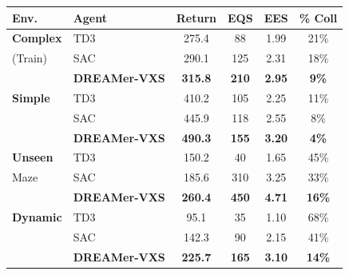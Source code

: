 \begin{table}
\centering


\begin{tabular}{@{}llcccc@{}}
\toprule
\textbf{Env.} & \textbf{Agent} & \textbf{Return} & \textbf{EQS} & \textbf{EES} & \textbf{\% Coll} \\
\midrule
\textbf{Complex} & TD3 & 275.4 & 88 & 1.99 & 21\% \\
(Train) & SAC & 290.1 & 125 & 2.31 & 18\% \\
& \textbf{DREAMer-VXS} & \textbf{315.8} & \textbf{210} & \textbf{2.95} & \textbf{9\%} \\
\midrule
\textbf{Simple} & TD3 & 410.2 & 105 & 2.25 & 11\% \\
& SAC & 445.9 & 118 & 2.55 & 8\% \\
& \textbf{DREAMer-VXS} & \textbf{490.3} & \textbf{155} & \textbf{3.20} & \textbf{4\%} \\
\midrule
\textbf{Unseen} & TD3 & 150.2 & 40 & 1.65 & 45\% \\
Maze & SAC & 185.6 & 310 & 3.25 & 33\% \\
& \textbf{DREAMer-VXS} & \textbf{260.4} & \textbf{450} & \textbf{4.71} & \textbf{16\%} \\
\midrule
\textbf{Dynamic} & TD3 & 95.1 & 35 & 1.10 & 68\% \\
& SAC & 142.3 & 90 & 2.15 & 41\% \\
& \textbf{DREAMer-VXS} & \textbf{225.7} & \textbf{165} & \textbf{3.10} & \textbf{14\%} \\
\bottomrule
\end{tabular}
\end{table}